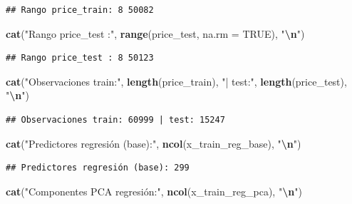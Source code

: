 \documentclass[
]{article}
\newenvironment{Shaded}{\begin{snugshade}}{\end{snugshade}}
\newcommand{\AttributeTok}[1]{\textcolor[rgb]{0.13,0.29,0.53}{#1}}
\newcommand{\ConstantTok}[1]{\textcolor[rgb]{0.56,0.35,0.01}{#1}}
\newcommand{\FunctionTok}[1]{\textcolor[rgb]{0.13,0.29,0.53}{\textbf{#1}}}
\newcommand{\NormalTok}[1]{#1}
\newcommand{\SpecialCharTok}[1]{\textcolor[rgb]{0.81,0.36,0.00}{\textbf{#1}}}
\newcommand{\StringTok}[1]{\textcolor[rgb]{0.31,0.60,0.02}{#1}}
\begin{document}
\begin{verbatim}
## Rango price_train: 8 50082
\end{verbatim}

\begin{Shaded}
\begin{Highlighting}[]
\FunctionTok{cat}\NormalTok{(}\StringTok{"Rango price\_test :"}\NormalTok{, }\FunctionTok{range}\NormalTok{(price\_test,  }\AttributeTok{na.rm =} \ConstantTok{TRUE}\NormalTok{), }\StringTok{"}\SpecialCharTok{\textbackslash{}n}\StringTok{"}\NormalTok{)}
\end{Highlighting}
\end{Shaded}

\begin{verbatim}
## Rango price_test : 8 50123
\end{verbatim}

\begin{Shaded}
\begin{Highlighting}[]
\FunctionTok{cat}\NormalTok{(}\StringTok{"Observaciones train:"}\NormalTok{, }\FunctionTok{length}\NormalTok{(price\_train), }\StringTok{"| test:"}\NormalTok{, }\FunctionTok{length}\NormalTok{(price\_test), }\StringTok{"}\SpecialCharTok{\textbackslash{}n}\StringTok{"}\NormalTok{)}
\end{Highlighting}
\end{Shaded}

\begin{verbatim}
## Observaciones train: 60999 | test: 15247
\end{verbatim}

\begin{Shaded}
\begin{Highlighting}[]
\FunctionTok{cat}\NormalTok{(}\StringTok{"Predictores regresión (base):"}\NormalTok{, }\FunctionTok{ncol}\NormalTok{(x\_train\_reg\_base), }\StringTok{"}\SpecialCharTok{\textbackslash{}n}\StringTok{"}\NormalTok{)}
\end{Highlighting}
\end{Shaded}

\begin{verbatim}
## Predictores regresión (base): 299
\end{verbatim}

\begin{Shaded}
\begin{Highlighting}[]
\FunctionTok{cat}\NormalTok{(}\StringTok{"Componentes PCA regresión:"}\NormalTok{, }\FunctionTok{ncol}\NormalTok{(x\_train\_reg\_pca), }\StringTok{"}\SpecialCharTok{\textbackslash{}n}\StringTok{"}\NormalTok{)}
\end{Highlighting}
\end{Shaded}
\end{document}
